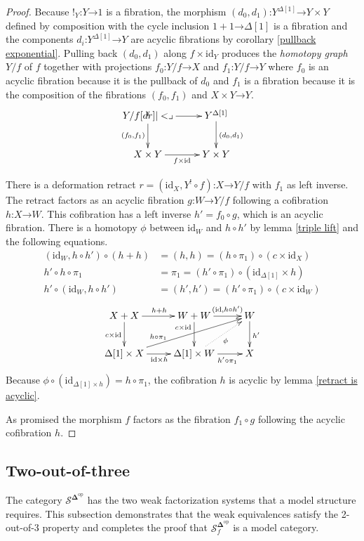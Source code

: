 \documentclass{amsart}
\theoremstyle{plain}
\theoremstyle{definition}
\newcommand\cat\mathcal
\newcommand\id{\mathrm{id}}
\newcommand\dual{^{\mathrm{op}}}
\newcommand\simCat{\mathbf\Delta}
\newcommand\s{^{\simCat\dual}}
\newcommand\bang{!}
\newcommand\of{\mathord:}
\renewcommand\to{\mathord\rightarrow}
\newcommand\simplex\Delta
\newcommand\f{_f}
\begin{document}
\begin{proof} Because $\bang_Y\of Y\to 1$ is a fibration, the morphism $(d_0,d_1)\of Y^{\simplex[1]} \to Y\times Y$ defined by composition with the cycle inclusion $1+1\to \simplex[1]$ is a fibration and the components $d_i\of Y^{\simplex[1]}\to Y$ are acyclic fibrations by corollary \ref{pullback exponential}. Pulling back $(d_0,d_1)$ along $f\times \id_Y$ produces the \emph{homotopy graph} $Y/f$ of $f$ together with projections $f_0\of Y/f\to X$ and $f_1\of Y/f\to Y$ where $f_0$ is an acyclic fibration because it is the pullback of $d_0$ and $f_1$ is a fibration because it is the composition of the fibrations $(f_0,f_1)$ and $X\times Y\to Y$.
\[\xymatrix{
Y/f \ar[r]\ar[d]_{(f_0,f_1)} \pb & Y^{\simplex[1]} \ar[d]^{(d_0,d_1)} \\
X\times Y \ar[r]_{f\times\id} & Y\times Y
}\]

There is a deformation retract $r=(\id_X,Y^\bang\circ f)\of X\to Y/f$ with $f_1$ as left inverse. The retract factors as an acyclic fibration $g\of W\to Y/f$ following a cofibration $h\of X\to W$. This cofibration has a left inverse $h' = f_0\circ g$, which is an acyclic fibration. There is a homotopy $\phi$ between $\id_{W}$ and $h\circ h'$ by lemma \ref{triple lift} and the following equations.
\begin{align*}
(\id_W,h\circ h')\circ(h+h)&=(h,h)= (h\circ\pi_1)\circ (c\times \id_X)\\
h'\circ h\circ \pi_1&=\pi_1=(h'\circ\pi_1)\circ(\id_{\simplex[1]}\times h)\\
h'\circ(\id_W,h\circ h')&=(h',h')= (h'\circ\pi_1)\circ (c\times \id_W)
\end{align*}
\[\xymatrix{
X+X\ar[d]_{c\times \id}\ar[r]^{h+h} & W+W\ar[d]_(.3){c\times \id}\ar[r]^(.6){(\id,h\circ h')} & W\ar[d]^{h'}\\
\simplex[1]\times X\ar[r]_{\id\times h} \ar[urr]^(.3){h\circ\pi_1}  & \simplex[1]\times W\ar[r]_(.6){h'\circ\pi_1} \ar@{.>}[ur]_\phi & X
}\]
Because $\phi\circ(\id_{\simplex[1]\times h}) = h\circ \pi_1$, the cofibration $h$ is acyclic by lemma \ref{retract is acyclic}. 

As promised the morphism $f$ factors as the fibration $f_1\circ g$ following the acyclic cofibration $h$.
\end{proof}

\subsection{Two-out-of-three}
The category $\cat S\s$ has the two weak factorization systems that a model structure requires. This subsection demonstrates that the weak equivalences satisfy the 2-out-of-3 property and completes the proof that $\cat S\s\f$ is a model category.
\end{document}
